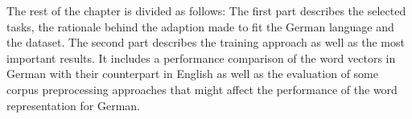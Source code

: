 The rest of the chapter is divided as follows: The first part describes the
selected tasks, the rationale behind the adaption made to fit the German
language and the dataset. The second part describes the training approach as well as the most
important results. It includes  a performance comparison of the word
vectors in German with their counterpart in English as well as  the evaluation of  some corpus
preprocessing approaches that might affect the performance of the word
representation for German.














